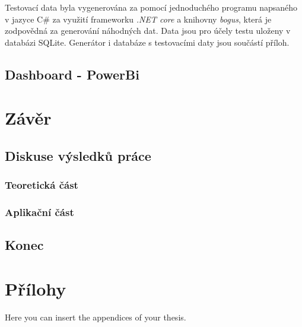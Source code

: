 \documentclass[
  digital,     %
  twoside,     %
  lof,         %
  lot,         %
]{fithesis4}
\begin{document}
Testovací data byla vygenerována za pomocí jednoduchého programu napsaného v jazyce C\# za využití frameworku \emph{.NET core} a knihovny \emph{bogus}, která je zodpovědná za generování náhodných dat. Data jsou pro účely testu uloženy v databázi SQLite. Generátor i databáze s testovacími daty jsou součástí příloh.


\section{Dashboard - PowerBi}


\chapter{Závěr}
\section{Diskuse výsledků práce}
\subsection{Teoretická část}
\subsection{Aplikační část}
\section{Konec}

\printbibliography[heading=bibintoc] %

  \makeatletter\thesis@blocks@clear\makeatother
  \printindex

\appendix %
\chapter{Přílohy}
Here you can insert the appendices of your thesis.
\end{document}
